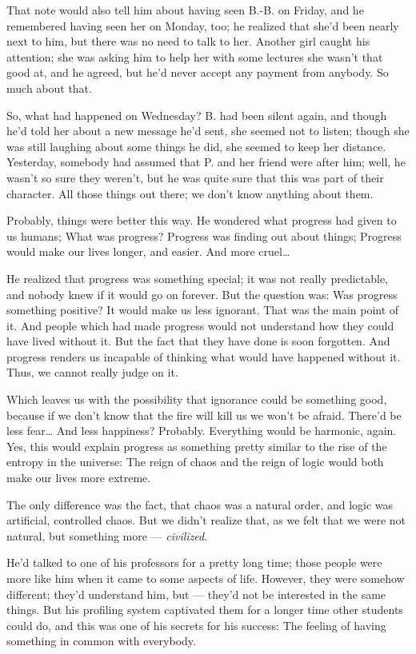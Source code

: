 That note would also tell him about having seen B.-B. on Friday, and he remembered having seen her on Monday, too; he realized that she'd been nearly next to him, but there was no need to talk to her. 
Another girl caught his attention; she was asking him to help her with some lectures she wasn't that good at, and he agreed, but he'd never accept any payment from anybody. 
So much about that.

So, what had happened on Wednesday? B. had been silent again, and though he'd told her about a new message he'd sent, she seemed not to listen; though she was still laughing about some things he did, she seemed to keep her distance. Yesterday, somebody had assumed that P. and her friend were after him; well, he wasn't so sure they weren't, but he was quite sure that this was part of their character. All those things out there; we don't know anything about them.

Probably, things were better this way. He wondered what progress had given to us humans; What was progress?
Progress was finding out about things; Progress would make our lives longer, and easier. And more cruel\dots{}

He realized that progress was something special; it was not really predictable, and nobody knew if it would go on forever. But the question was: Was progress something positive?
It would make us less ignorant. That was the main point of it. And people which had made progress would not understand how they could have lived without it. But the fact that they have done is soon forgotten. And progress renders us incapable of thinking what would have happened without it. Thus, we cannot really judge on it.

Which leaves us with the possibility that ignorance could be something good, because if we don't know that the fire will kill us we won't be afraid. There'd be less fear\dots{}
And less happiness? Probably. Everything would be harmonic, again. Yes, this would explain progress as something pretty similar to the rise of the entropy in the universe: The reign of chaos and the reign of logic would both make our lives more extreme.

The only difference was the fact, that chaos was a natural order, and logic was artificial, controlled chaos. 
But we didn't realize that, as we felt that we were not natural, but something more --- \emph{civilized}.

He'd talked to one of his professors for a pretty long time; those people were more like him when it came to some aspects of life. However, they were somehow different; they'd understand him, but --- they'd not be interested in the same things. But his profiling system captivated them for a longer time other students could do, and this was one of his secrets for his success: The feeling of having something in common with everybody.

